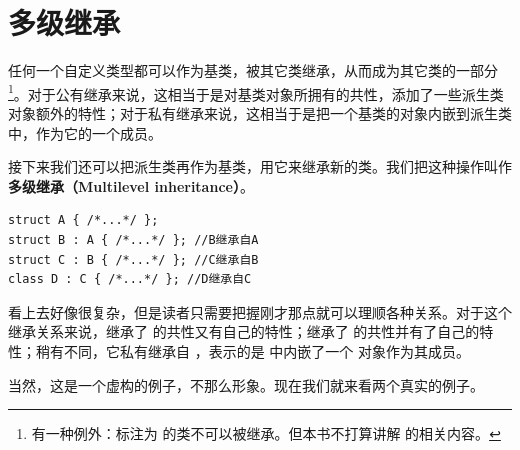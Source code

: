 \section{多级继承}
任何一个自定义类型都可以作为基类，被其它类继承，从而成为其它类的一部分\footnote{有一种例外：标注为 \lstinline@final@ 的类不可以被继承。但本书不打算讲解 \lstinline@final@ 的相关内容。}。对于公有继承来说，这相当于是对基类对象所拥有的共性，添加了一些派生类对象额外的特性；对于私有继承来说，这相当于是把一个基类的对象内嵌到派生类中，作为它的一个成员。\par
接下来我们还可以把派生类再作为基类，用它来继承新的类。我们把这种操作叫作\textbf{多级继承（Multilevel inheritance）}。
\begin{lstlisting}
struct A { /*...*/ };
struct B : A { /*...*/ }; //B继承自A
struct C : B { /*...*/ }; //C继承自B
class D : C { /*...*/ }; //D继承自C
\end{lstlisting}
看上去好像很复杂，但是读者只需要把握刚才那点就可以理顺各种关系。对于这个继承关系来说，\lstinline@B@ 继承了 \lstinline@A@ 的共性又有自己的特性；\lstinline@C@ 继承了 \lstinline@B@ 的共性并有了自己的特性；\lstinline@D@ 稍有不同，它私有继承自 \lstinline@C@，表示的是 \lstinline@D@ 中内嵌了一个 \lstinline@C@ 对象作为其成员。\par
当然，这是一个虚构的例子，不那么形象。现在我们就来看两个真实的例子。\par
